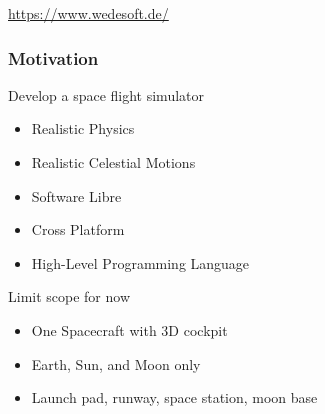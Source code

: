 \documentclass[aspectratio=169,11pt,xcolor=dvipsnames]{beamer}
\begin{document}
\begin{frame}
\begin{minipage}[b]{0.2\textwidth}
    \begin{tiny}
      \url{https://www.wedesoft.de/}
    \end{tiny}
  \end{minipage}
\end{frame}

\begin{frame}
  \frametitle{Motivation}
  \begin{minipage}[t]{0.49\textwidth}
    Develop a space flight simulator
    \begin{itemize}
      \item Realistic Physics
      \item Realistic Celestial Motions
      \item Software Libre
      \item Cross Platform
      \item High-Level Programming Language
    \end{itemize}
  \end{minipage}
  \begin{minipage}[t]{0.49\textwidth}
    Limit scope for now
    \begin{itemize}
      \item One Spacecraft with 3D cockpit
      \item Earth, Sun, and Moon only
      \item Launch pad, runway, space station, moon base
    \end{itemize}
  \end{minipage}
\end{frame}
\end{document}
